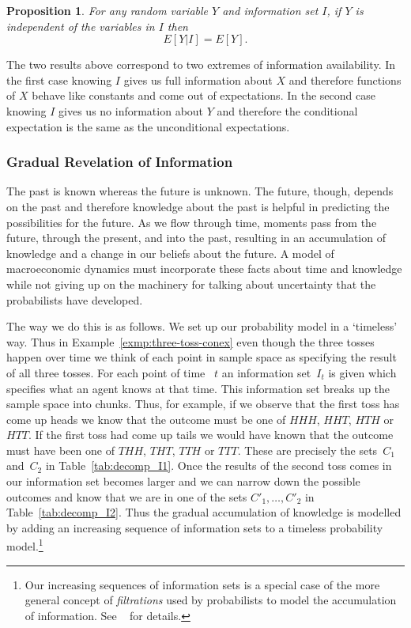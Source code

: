 \documentclass[12pt,reqno,openany]{amsbook}
\theoremstyle{plain}
\newtheorem{prop}{Proposition}[chapter]
\theoremstyle{definition}
\newcommand{\newterm}[1]{\emph{#1}}
\begin{document}
\begin{prop}\label{prop:conex-ind}
For any random variable $Y$ and information set $I$, if $Y$ is
  independent of the variables in $I$ then
  \[E[Y|I]=E[Y].\]
\end{prop}

The two results above correspond to two extremes of information
availability. In the first case knowing $I$ gives us full information
about $X$ and therefore functions of $X$ behave like constants and
come out of expectations. In the second case knowing $I$ gives us no
information about $Y$ and therefore the conditional expectation is
the same as the unconditional expectations.

\subsubsection{Gradual Revelation of Information}
The past is known whereas the future is unknown. The future, though,
depends on the past and therefore knowledge about the past is helpful
in predicting the possibilities for the future. As we flow through
time, moments pass from the future, through the present, and into the
past, resulting in an accumulation of knowledge and a change in our
beliefs about the future. A model of macroeconomic dynamics must
incorporate these facts about time and knowledge while not giving up
on the machinery for talking about uncertainty that the
probabilists have developed. 

The way we do this is as follows. We set up our probability model in a
`timeless' way. Thus in Example~\ref{exmp:three-toss-conex} even
though the three tosses happen over time we think of each point in
sample space as specifying the result of all three tosses. For each
point of time~ $t$ an information set~$I_t$ is given which specifies
what an agent knows at that time. This information set breaks up the
sample space into chunks. Thus, for example, if we observe that the
first toss has come up heads we know that the outcome must be one of
$HHH$, $HHT$, $HTH$ or $HTT$. If the first toss had come up tails we
would have known that the outcome must have been one of $THH$, $THT$,
$TTH$ or $TTT$. These are precisely the sets~$C_1$ and~$C_2$ in
Table~\ref{tab:decomp_I1}. Once the results of the second toss comes
in our information set becomes larger and we can narrow down the
possible outcomes and know that we are in one of the sets
$C'_1,\ldots,C'_2$ in Table~\ref{tab:decomp_I2}. Thus the gradual
accumulation of knowledge is modelled by adding an increasing sequence
of information sets to a timeless probability model.\footnote{Our increasing
  sequences of information sets is a special case of the more general
  concept of \newterm{filtrations} used by probabilists to model the
  accumulation of information. See ~\cite{billingsley-prob-measure} for details.} 
\end{document}
